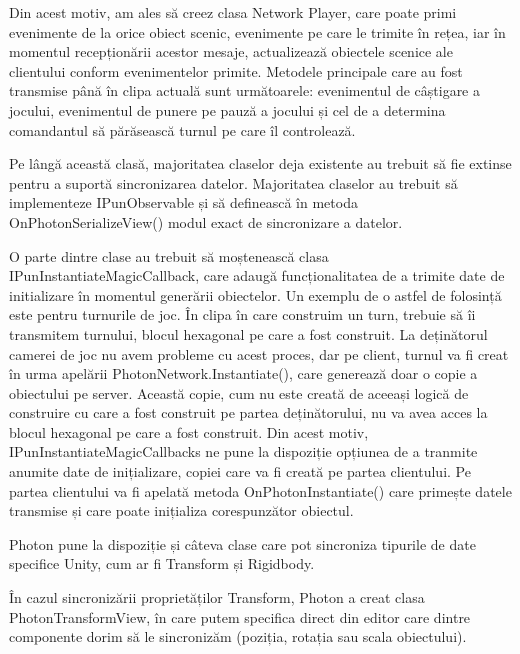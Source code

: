 \documentclass[12pt, a4paper]{article}
\begin{document}
	Din acest motiv, am ales să creez clasa Network Player, care poate primi evenimente de la orice obiect scenic, evenimente pe care le trimite în rețea, iar în momentul recepționării acestor mesaje, actualizează obiectele scenice ale clientului conform evenimentelor primite. Metodele principale care au fost transmise până în clipa actuală sunt următoarele: evenimentul de câștigare a jocului, evenimentul de punere pe pauză a jocului și cel de a determina comandantul să părăsească turnul pe care îl controlează.
	\newline
	
	Pe lângă această clasă, majoritatea claselor deja existente au trebuit să fie extinse pentru a suportă sincronizarea datelor. Majoritatea claselor au trebuit să implementeze IPunObservable și să definească în metoda OnPhotonSerializeView() modul exact de sincronizare a datelor.
	\newline
	
	O parte dintre clase au trebuit să moștenească clasa IPunInstantiateMagicCallback, care adaugă funcționalitatea de a trimite date de initializare în momentul generării obiectelor. Un exemplu de o astfel de folosință este pentru turnurile de joc. În clipa în care construim un turn, trebuie să îi transmitem turnului, blocul hexagonal pe care a fost construit. La deținătorul camerei de joc nu avem probleme cu acest proces, dar pe client, turnul va fi creat în urma apelării PhotonNetwork.Instantiate(), care generează doar o copie a obiectului pe server. Această copie, cum nu este creată de aceeași logică de construire cu care a fost construit pe partea deținătorului, nu va avea acces la blocul hexagonal pe care a fost construit. Din acest motiv, IPunInstantiateMagicCallbacks ne pune la dispoziție opțiunea de a tranmite anumite date de inițializare, copiei care va fi creată pe partea clientului. Pe partea clientului va fi apelată metoda OnPhotonInstantiate() care primește datele transmise și care poate inițializa corespunzător obiectul.
	\newline
	
	Photon pune la dispoziție și câteva clase care pot sincroniza tipurile de date specifice Unity, cum ar fi Transform și Rigidbody. 
	\newline
	
	În cazul sincronizării proprietăților Transform, Photon a creat clasa PhotonTransformView, în care putem specifica direct din editor care dintre componente dorim să le sincronizăm (poziția, rotația sau scala obiectului). 
	\newline
	
\end{document}
